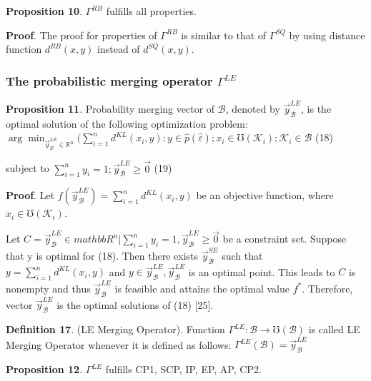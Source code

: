 \documentclass[]{iosart2c}
\begin{document}
\textbf{Proposition 10}. $\Gamma^{RB}$ fulfills all properties.

\textbf{Proof}. The proof for properties of $\Gamma^{RB}$ is similar
to that of $\Gamma^{SQ}$ by using distance function $d^{RB}(x, y)$
instead of $d^{SQ}(x, y)$.

\subsubsection{The probabilistic merging operator $\Gamma^{LE}$}

\textbf{Proposition 11}. Probability merging vector of $\mathcal{B}$,
denoted by $\vec{y}^{LE}_\mathcal{B}$, is the optimal solution of the following optimization problem:
$\arg \min_{\vec{y}^{LE}_\mathcal{B} \in \mathbb{R}^n} (\sum^n_{i=1} d^{KL}(x_i, y) : 
y \in \hat{p}(\hat{\varepsilon}); x_i \in \mho(\mathcal{K}_i);\mathcal{K}_i \in \mathcal{B}$ (18)

subject to $\sum^n_{i=1} y_i = 1; \vec{y}^{LE}_\mathcal{B} \geq \vec{0}$ (19)

\textbf{Proof}. Let $f(\vec{y}^{LE}_\mathcal{B} ) = \sum^n_{i=1} d^{KL}(x_i, y)$ be an objective function, where $x_i \in \mho(\mathcal{K}_i)$.

Let $C = {\vec{y}^{LE}_\mathcal{B} \in mathbb{R}^n|\sum^n_{i=1} y_i = 1, \vec{y}^{LE}_\mathcal{B} \geq \vec{0} }$ be a
constraint set. Suppose that y is optimal for (18).
Then there exists $\vec{y}^{SE}_\mathcal{B}$ such that $y = \sum^n_{i=1} d^{KL}(x_i, y)$
and $y \in \vec{y}^{LE}_\mathcal{B} , \vec{y}^{LE}_\mathcal{B}$ is an optimal point. This leads to
$C$ is nonempty and thus $\vec{y}^{LE}_\mathcal{B}$ is feasible and attains
the optimal value $f^*$. Therefore, vector $\vec{y}^{LE}_\mathcal{B}$ is the
optimal solutions of (18) [25].

\textbf{Definition 17}. (LE Merging Operator). Function 
$\Gamma^{LE} : \mathcal{B} \to \mho(\mathcal{B})$ is called LE Merging Operator
whenever it is defined as follows: $\Gamma^{LE}(\mathcal{B}) = \vec{y}^{LE}_\mathcal{B}$

\textbf{Proposition 12}. $\Gamma^{LE}$ fulfills CP1, SCP, IP, EP, AP, CP2.
\end{document}
